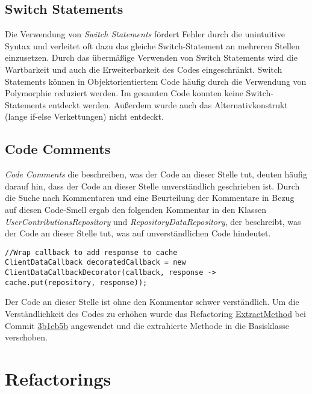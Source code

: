 \subsection{Switch Statements}

Die Verwendung von \textit{Switch Statements} fördert Fehler durch die unintuitive Syntax und verleitet oft dazu das gleiche Switch-Statement an mehreren Stellen einzusetzen.
Durch das übermäßige Verwenden von Switch Statements wird die Wartbarkeit und auch die Erweiterbarkeit des Codes eingeschränkt.
Switch Statements können in Objektorientiertem Code häufig durch die Verwendung von Polymorphie reduziert werden.
\newline
\newline
Im gesamten Code konnten keine Switch-Statements entdeckt werden. Außerdem wurde auch das Alternativkonstrukt (lange if-else Verkettungen) nicht entdeckt.

\subsection{Code Comments}

\textit{Code Comments} die beschreiben, was der Code an dieser Stelle tut, deuten häufig darauf hin, dass der Code an dieser Stelle unverständlich geschrieben ist.
\newline
\newline
Durch die Suche nach Kommentaren und eine Beurteilung der Kommentare in Bezug auf diesen Code-Smell ergab den folgenden Kommentar in den Klassen \textit{UserContributionsRepository} und \textit{RepositoryDataRepository}, der beschreibt, was der Code an dieser Stelle tut, was auf unverständlichen Code hindeutet.
\begin{lstlisting}
//Wrap callback to add response to cache
ClientDataCallback decoratedCallback = new ClientDataCallbackDecorator(callback, response ->  cache.put(repository, response));
\end{lstlisting}
Der Code an dieser Stelle ist ohne den Kommentar schwer verständlich. Um die Verständlichkeit des Codes zu erhöhen wurde das Refactoring {\hyperref[sec:ExtractMethod_Repository]{ExtractMethod}} bei Commit \href{https://github.com/lukaspanni/OpenSourceStats/commit/3b1eb5bf6750c3ccaeb05962ec8a8ae743adbf2c} {3b1eb5b} angewendet und die extrahierte Methode in die Basisklasse verschoben.


\newpage
\section{Refactorings}
\label{sec:Refactorings}

